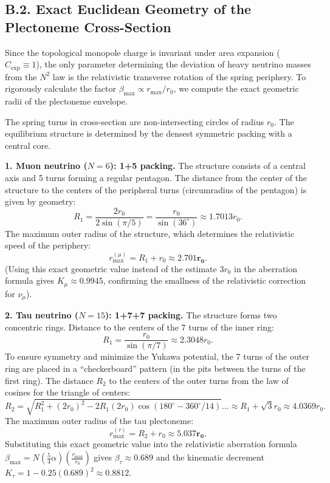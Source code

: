 \documentclass[11pt,a4paper]{article}
\begin{document}
\subsection*{B.2. Exact Euclidean Geometry of the Plectoneme Cross-Section}
Since the topological monopole charge is invariant under area expansion ($C_{\text{exp}} \equiv 1$), the only parameter determining the deviation of heavy neutrino masses from the $N^2$ law is the relativistic transverse rotation of the spring periphery. To rigorously calculate the factor $\beta_{\text{max}} \propto r_{\text{max}}/r_0$, we compute the exact geometric radii of the plectoneme envelope.

The spring turns in cross-section are non-intersecting circles of radius $r_0$. The equilibrium structure is determined by the densest symmetric packing with a central core.

\textbf{1. Muon neutrino ($N=6$): 1+5 packing.}
The structure consists of a central axis and 5 turns forming a regular pentagon. The distance from the center of the structure to the centers of the peripheral turns (circumradius of the pentagon) is given by geometry:
\begin{equation}
R_1 = \frac{2 r_0}{2 \sin(\pi/5)} = \frac{r_0}{\sin(36^\circ)} \approx 1.7013 r_0.
\end{equation}
The maximum outer radius of the structure, which determines the relativistic speed of the periphery:
\begin{equation}
r_{\text{max}}^{(\mu)} = R_1 + r_0 \approx \mathbf{2.701 r_0}.
\end{equation}
(Using this exact geometric value instead of the estimate $3r_0$ in the aberration formula gives $K_\mu \approx 0.9945$, confirming the smallness of the relativistic correction for $\nu_\mu$).

\textbf{2. Tau neutrino ($N=15$): 1+7+7 packing.}
The structure forms two concentric rings. Distance to the centers of the 7 turns of the inner ring:
\begin{equation}
R_1 = \frac{r_0}{\sin(\pi/7)} \approx 2.3048 r_0.
\end{equation}
To ensure symmetry and minimize the Yukawa potential, the 7 turns of the outer ring are placed in a ``checkerboard'' pattern (in the pits between the turns of the first ring). The distance $R_2$ to the centers of the outer turns from the law of cosines for the triangle of centers:
\begin{equation}
R_2 = \sqrt{R_1^2 + (2r_0)^2 - 2R_1(2r_0)\cos(180^\circ - 360^\circ/14)} \dots \approx R_1 + \sqrt{3}r_0 \approx 4.0369 r_0.
\end{equation}
The maximum outer radius of the tau plectoneme:
\begin{equation}
r_{\text{max}}^{(\tau)} = R_2 + r_0 \approx \mathbf{5.037 r_0}.
\end{equation}
Substituting this exact geometric value into the relativistic aberration formula $\beta_{\text{max}} = N (\frac{5}{4}\alpha) (\frac{r_{\text{max}}}{r_0})$ gives $\beta_\tau \approx 0.689$ and the kinematic decrement $K_\tau = 1 - 0.25(0.689)^2 \approx \mathbf{0.8812}$.
\end{document}
